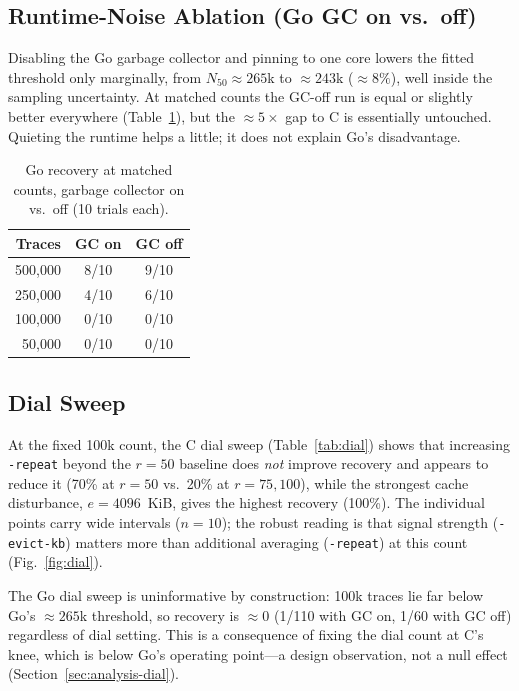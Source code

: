 \subsection{Runtime-Noise Ablation (Go GC on vs.\ off)}
\label{sec:results-gc}
Disabling the Go garbage collector and pinning to one core lowers the fitted
threshold only marginally, from $N_{50}\approx 265$k to $\approx 243$k
($\approx 8\%$), well inside the sampling uncertainty. At matched counts the
GC-off run is equal or slightly better everywhere (Table~\ref{tab:gc}), but the
$\approx 5\times$ gap to C is essentially untouched. Quieting the runtime helps
a little; it does not explain Go's disadvantage.

\begin{table}[t]
\centering
\caption{Go recovery at matched counts, garbage collector on vs.\ off
(10 trials each).}
\label{tab:gc}
\begin{tabular}{rcc}
\toprule
Traces & GC on & GC off \\
\midrule
500{,}000 & 8/10 & 9/10 \\
250{,}000 & 4/10 & 6/10 \\
100{,}000 & 0/10 & 0/10 \\
50{,}000  & 0/10 & 0/10 \\
\bottomrule
\end{tabular}
\end{table}

\subsection{Dial Sweep}
\label{sec:results-dial}
At the fixed 100k count, the C dial sweep (Table~\ref{tab:dial}) shows that
increasing \texttt{-repeat} beyond the $r=50$ baseline does \emph{not} improve
recovery and appears to reduce it (70\% at $r=50$ vs.\ 20\% at $r=75,100$),
while the strongest cache disturbance, $e=4096$~KiB, gives the highest recovery
(100\%). The individual points carry wide intervals ($n=10$); the robust reading
is that signal strength (\texttt{-evict-kb}) matters more than additional
averaging (\texttt{-repeat}) at this count (Fig.~\ref{fig:dial}).

The Go dial sweep is uninformative by construction: 100k traces lie far below
Go's $\approx 265$k threshold, so recovery is $\approx 0$ (1/110 with GC on,
1/60 with GC off) regardless of dial setting. This is a consequence of fixing
the dial count at C's knee, which is below Go's operating point---a design
observation, not a null effect (Section~\ref{sec:analysis-dial}).

